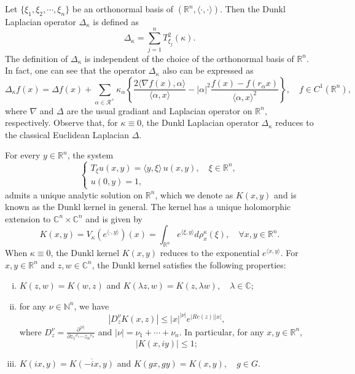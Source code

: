 \documentclass[a4paper,11pt, reqno]{amsart}
\numberwithin{equation}{section}
\theoremstyle{plain}
\theoremstyle{definition}
\theoremstyle{remark}
\begin{document}
	Let $\{\xi_1, \xi_2, \cdots, \xi_n\}$ be an orthonormal basis of $(\mathbb{R}^n , \langle \cdot, \cdot\rangle )$. Then  the Dunkl Laplacian operator $\Delta_\kappa $ is defined as $$\Delta_\kappa=\sum_{j=1}^nT^2_{\xi_j}(\kappa).$$
	The definition of  $\Delta_\kappa$ is independent of the choice of the orthonormal basis of $\mathbb{R}^n.$ In fact,   one can see that the operator $\Delta_\kappa $ also can be expressed as $$\Delta_\kappa f(x)=\Delta f(x)+\sum_{\alpha \in \mathcal{R}^+}\kappa_\alpha \left\{\frac{2 \langle \nabla f(x),  \alpha \rangle}{\langle \alpha, x\rangle } -|\alpha|^2 \frac{f(x)-f(r_\alpha x)}{\langle \alpha, x\rangle^2 } \right\}, \quad f\in C^1(\mathbb{R}^n),$$
	where $\nabla$ and $\Delta$ are    the usual gradiant  and   Laplacian operator on $\mathbb{R}^n$, respectively.  Observe that, for $\kappa \equiv 0$, the Dunkl Laplacian operator $\Delta_\kappa$ reduces to the classical Euclidean Laplacian $\Delta$. 

For every $y\in\mathbb{R}^n$, the system 
\begin{equation*}
	\begin{cases}
	T_\xi u(x,y)=\langle y,\xi\rangle\, u(x,y), \quad \xi\in\mathbb{R}^n,\\
	u(0,y)=1,
	\end{cases}
	\end{equation*}
admits a unique analytic solution on $\mathbb{R}^n$, which we denote as  $K(x,y)$ and is known as the Dunkl kernel in general. The kernel has a unique holomorphic extension to $\mathbb{C}^n\times \mathbb{C}^n$ and is given by
\begin{equation*}
K(x,y)=V_\kappa(e^{\langle \cdot,y\rangle})(x)=\int_{\mathbb{R}^n}e^{\langle \xi,y\rangle}d\rho_x^\kappa(\xi),\quad \forall x,y\in\mathbb{R}^n.
	\end{equation*}
When $\kappa \equiv 0$, the Dunkl kernel $K(x,y)$  reduces to the exponential $e^{\langle x,y\rangle}$. For $x,y\in\mathbb{R}^n$ and  $z,w\in\mathbb{C}^n$, the Dunkl kernel satisfies the following properties:
\begin{enumerate}[(i)]
    \item $K(z,w)=K(w,z)$ and $K(\lambda z,w)=K(z,\lambda w),\quad \lambda\in\mathbb{C}$;
    \item  for any $\nu\in\mathbb{N}^n$, we have
$$|D_z^\nu K(x,z)|\leq |x|^{|\nu|}e^{|Re(z)||x|},$$
where $D_z^\nu=\frac{\partial^{|\nu|}}{\partial {z_1}^{\nu_1}\cdots {z_n}^{\nu_n}}$ and $|\nu|=\nu_1+\cdots+\nu_n$. In particular, for any $x,y\in\mathbb{R}^n$, 
$$|K(x,iy)|\leq 1;$$
\item $K(ix,y)=\overline{K(-ix,y)}$ and $K(gx,gy)=K(x,y),\quad g\in G$.
\end{enumerate}
\end{document}
